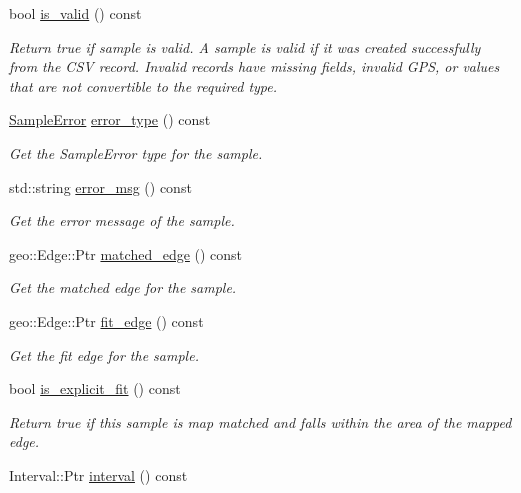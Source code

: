 \begin{DoxyCompactItemize}
bool \hyperlink{classgeo__data_1_1Sample_ae009ad7cc3106219b77123ba4e5d3238}{is\+\_\+valid} () const 
\begin{DoxyCompactList}\small\item\em Return true if sample is valid. A sample is valid if it was created successfully from the C\+SV record. Invalid records have missing fields, invalid G\+PS, or values that are not convertible to the required type. \end{DoxyCompactList}\item 
\hyperlink{namespacegeo__data_a2374ba83ef1f8bcad5d82c67dc7c8ddd}{Sample\+Error} \hyperlink{classgeo__data_1_1Sample_a6aaf864d36093ef23cb5a273d45f4f01}{error\+\_\+type} () const 
\begin{DoxyCompactList}\small\item\em Get the Sample\+Error type for the sample. \end{DoxyCompactList}\item 
std\+::string \hyperlink{classgeo__data_1_1Sample_a5ad107d3bca8ca053e785f24efae6c28}{error\+\_\+msg} () const 
\begin{DoxyCompactList}\small\item\em Get the error message of the sample. \end{DoxyCompactList}\item 
geo\+::\+Edge\+::\+Ptr \hyperlink{classgeo__data_1_1Sample_a17881dc1186aa58c6923187b4386bf45}{matched\+\_\+edge} () const 
\begin{DoxyCompactList}\small\item\em Get the matched edge for the sample. \end{DoxyCompactList}\item 
geo\+::\+Edge\+::\+Ptr \hyperlink{classgeo__data_1_1Sample_adf2425e64a0cda4f6f247ec89ee9f708}{fit\+\_\+edge} () const 
\begin{DoxyCompactList}\small\item\em Get the fit edge for the sample. \end{DoxyCompactList}\item 
bool \hyperlink{classgeo__data_1_1Sample_a2c71fa2fbc417fcb031da4009d15c4ea}{is\+\_\+explicit\+\_\+fit} () const 
\begin{DoxyCompactList}\small\item\em Return true if this sample is map matched and falls within the area of the mapped edge. \end{DoxyCompactList}\item 
Interval\+::\+Ptr \hyperlink{classgeo__data_1_1Sample_a4461eedbc44d2a528f2e502929bb1053}{interval} () const 

\end{DoxyCompactItemize}
